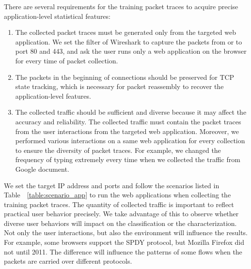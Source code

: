 There are several requirements for the training packet traces to acquire precise application-level statistical features:
\begin{enumerate}
\item 
The collected packet traces must be generated only from the targeted web application. We set the filter of Wireshark to capture the packets from or to port 80 and 443, and ask the user runs only a web application on the browser for every time of packet collection.
\item
The packets in the beginning of connections should be preserved for TCP state tracking, which is necessary for packet reassembly to recover the application-level features.
\item
The collected traffic should be sufficient and diverse because it may affect the accuracy and reliability. The collected traffic must contain the packet traces from the user interactions from the targeted web application. Moreover, we performed various interactions on a same web application for every collection to ensure the diversity of packet traces. For example, we changed the frequency of typing extremely every time when we collected the traffic from Google document.
\end{enumerate}

We set the target IP address and ports and follow the scenarios listed in Table~~\ref{table:scenario_app} to run the web applications when collecting the training packet traces. The quantity of collected traffic is important to reflect practical user behavior precisely. We take advantage of this to observe whether diverse user behaviors will impact on the classification or the characterization. Not only the user interactions, but also the environment will influence the results. For example, some browsers support the SPDY protocol, but Mozilla Firefox did not until 2011. The difference will influence the patterns of some flows when the packets are carried over different protocols.

